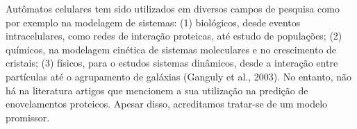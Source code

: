 Autômatos celulares tem sido utilizados em diversos campos de pesquisa como por exemplo na modelagem de sistemas: (1) biológicos, desde eventos intracelulares, como redes de interação proteicas, até estudo de populações; (2) químicos, na modelagem cinética de sistemas moleculares e no crescimento de cristais; (3) físicos, para o estudos sistemas dinâmicos, desde a interação entre partículas até o agrupamento de galáxias (Ganguly et al., 2003). No entanto, não há na literatura artigos que mencionem a sua utilização na predição de enovelamentos proteicos. Apesar disso, acreditamos tratar-se de um modelo promissor.










